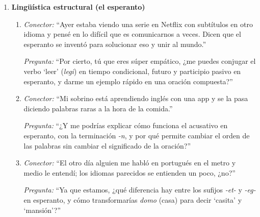 \begin{enumerate}[label=\textbf{Tema \arabic*.}, wide=0pt, leftmargin=0pt, itemsep=0.6em]
  \item \textbf{Lingüística estructural (el esperanto)}
  \begin{enumerate}[label=\alph*), leftmargin=1.8em, itemsep=0.3em]
    \item \textit{Conector:} \enquote{Ayer estaba viendo una serie en Netflix con subtítulos en otro idioma y pensé en lo difícil que es comunicarnos a veces. Dicen que el esperanto se inventó para solucionar eso y unir al mundo.}\par
    \textit{Pregunta:} \enquote{Por cierto, tú que eres súper empático, ¿me puedes conjugar el verbo \enquote{leer} (\textit{legi}) en tiempo condicional, futuro y participio pasivo en esperanto, y darme un ejemplo rápido en una oración compuesta?}
    \item \textit{Conector:} \enquote{Mi sobrino está aprendiendo inglés con una app y se la pasa diciendo palabras raras a la hora de la comida.}\par
    \textit{Pregunta:} \enquote{¿Y me podrías explicar cómo funciona el acusativo en esperanto, con la terminación \textit{-n}, y por qué permite cambiar el orden de las palabras sin cambiar el significado de la oración?}
    \item \textit{Conector:} \enquote{El otro día alguien me habló en portugués en el metro y medio le entendí; los idiomas parecidos se entienden un poco, ¿no?}\par
    \textit{Pregunta:} \enquote{Ya que estamos, ¿qué diferencia hay entre los sufijos \textit{-et-} y \textit{-eg-} en esperanto, y cómo transformarías \textit{domo} (casa) para decir \enquote{casita} y \enquote{mansión}?}
  \end{enumerate}


\end{enumerate}
